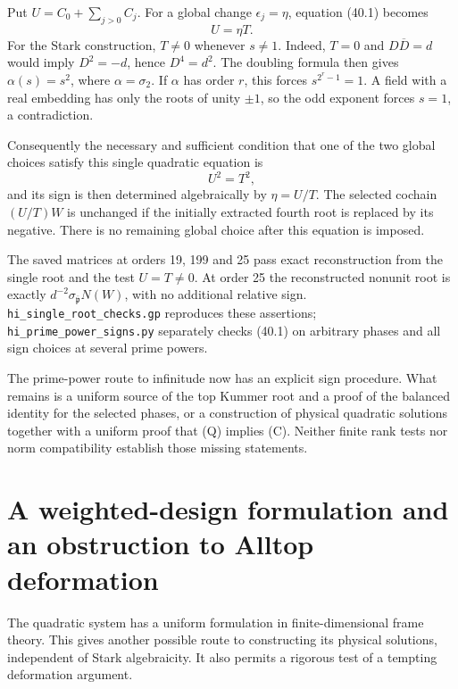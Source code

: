 \documentclass[11pt,reqno]{amsart}
\theoremstyle{plain}
\begin{document}
Put \(U=C_0+\sum_{j>0}C_j\). For a global change
\(\epsilon_j=\eta\), equation (40.1) becomes
\begin{equation*}
 U=\eta T. \tag{40.3}
\end{equation*}
For the Stark construction, \(T\ne0\) whenever \(s\ne1\).
Indeed, \(T=0\) and \(D\overline D=d\) would imply
\(D^2=-d\), hence \(D^4=d^2\). The doubling formula then gives
\(\alpha(s)=s^2\), where \(\alpha=\sigma_2\). If \(\alpha\)
has order \(r\), this forces \(s^{2^r-1}=1\). A field with a
real embedding has only the roots of unity \(\pm1\), so the odd
exponent forces \(s=1\), a contradiction.

Consequently the necessary and sufficient condition that one of
the two global choices satisfy this single quadratic equation is
\[
 U^2=T^2,
\]
and its sign is then determined algebraically by \(\eta=U/T\).
The selected cochain \((U/T)W\) is unchanged if the initially
extracted fourth root is replaced by its negative. There is no
remaining global choice after this equation is imposed.

The saved matrices at orders 19, 199 and 25 pass exact reconstruction
from the single root and the test \(U=T\ne0\). At order 25 the
reconstructed nonunit root is exactly
\(d^{-2}\sigma_{\overline{\mathfrak p}}N(W)\), with no additional
relative sign. \texttt{hi\_\allowbreak single\_\allowbreak root\_\allowbreak checks.gp} reproduces these assertions;
\texttt{hi\_\allowbreak prime\_\allowbreak power\_\allowbreak signs.py} separately checks (40.1) on arbitrary
phases and all sign choices at several prime powers.

The prime-power route to infinitude now has an explicit sign procedure.
What remains is a uniform source of the top Kummer root and a proof
of the balanced identity for the selected phases, or a construction
of physical quadratic solutions together with a uniform proof that
(Q) implies (C). Neither finite rank tests nor norm compatibility
establish those missing statements.

\section{A weighted-design formulation and an obstruction to Alltop deformation}\label{sec:41}

The quadratic system has a uniform formulation in finite-dimensional
frame theory. This gives another possible route to constructing its
physical solutions, independent of Stark algebraicity. It also permits
a rigorous test of a tempting deformation argument.
\end{document}
